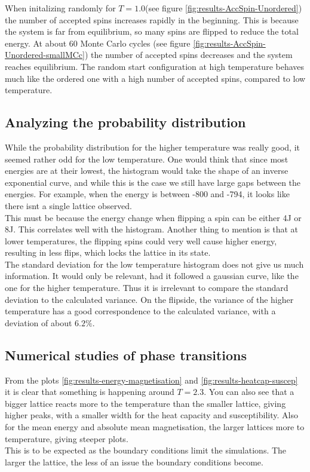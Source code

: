 \documentclass[../main.tex]{subfiles}
\begin{document}
When initalizing randomly for $T = 1.0$(see figure \ref{fig:results-AccSpin-Unordered}) the number of accepted spins increases rapidly in the beginning. This is because the system is far from equilibrium, so many spins are flipped to reduce the total energy. At about 60 Monte Carlo cycles (see figure \ref{fig:results-AccSpin-Unordered-smallMCc}) the number of accepted spins decreases and the system reaches equilibrium. The random start configuration at high temperature behaves much like the ordered one with a high number of accepted spins, compared to low temperature.
\subsection{Analyzing the probability distribution}
While the probability distribution for the higher temperature was really good, it seemed rather odd for the low temperature. One would think that since most energies are at their lowest, the histogram would take the shape of an inverse exponential curve, and while this is the case we still have large gaps between the energies. For example, when the energy is between -800 and -794, it looks like there isnt a single lattice observed. \\
This must be because the energy change when flipping a spin can be either 4J or 8J. This correlates well with the histogram. Another thing to mention is that at lower temperatures, the flipping spins could very well cause higher energy, resulting in less flips, which locks the lattice in its state. \\
The standard deviation for the low temperature histogram does not give us much information. It would only be relevant, had it followed a gaussian curve, like the one for the higher temperature. Thus it is irrelevant to compare the standard deviation to the calculated variance. On the flipside, the variance of the higher temperature has a good correspondence to the calculated variance, with a deviation of about $6.2\%$.

\subsection{Numerical studies of phase transitions}
From the plots \ref{fig:results-energy-magnetisation} and \ref{fig:results-heatcap-suscep} it is clear that something is happening around $T = 2.3$. You can also see that a bigger lattice reacts more to the temperature than the smaller lattice, giving higher peaks, with a smaller width for the heat capacity and susceptibility. Also for the mean energy and absolute mean magnetisation, the larger lattices  more to temperature, giving steeper plots.\\
This is to be expected as the boundary conditions limit the simulations. The larger the lattice, the less of an issue the boundary conditions become.
\end{document}
